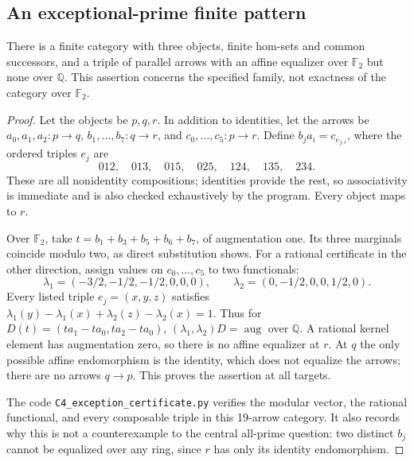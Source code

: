 \subsection{An exceptional-prime finite pattern}
\begin{proposition}
\label{C4:exception}
There is a finite category with three objects, finite hom-sets and common
successors, and a triple of parallel arrows with an affine equalizer over
$\mathbb F_2$ but none over $\mathbb Q$. This assertion concerns the
specified family, not exactness of the category over $\mathbb F_2$.
\end{proposition}
\begin{proof}
Let the objects be $p,q,r$. In addition to identities, let the arrows
be $a_0,a_1,a_2:p\to q$, $b_1,\ldots,b_7:q\to r$, and
$c_0,\ldots,c_5:p\to r$. Define $b_j a_i=c_{e_{j,i}}$, where the
ordered triples $e_j$ are
\[
 012,\quad013,\quad015,\quad025,\quad124,\quad135,\quad234.
\]
These are all nonidentity compositions; identities provide the rest,
so associativity is immediate and is also checked exhaustively by the
program. Every object maps to $r$.

Over $\mathbb F_2$, take
$t=b_1+b_3+b_5+b_6+b_7$, of augmentation one. Its three marginals
coincide modulo two, as direct substitution shows.
For a rational certificate in the other direction, assign values on
$c_0,\ldots,c_5$ to two functionals:
\[
 \lambda_1=(-3/2,-1/2,-1/2,0,0,0),\qquad
 \lambda_2=(0,-1/2,0,0,1/2,0).
\]
Every listed triple $e_j=(x,y,z)$ satisfies
$\lambda_1(y)-\lambda_1(x)+\lambda_2(z)-\lambda_2(x)=1$.
Thus for $D(t)=(ta_1-ta_0,ta_2-ta_0)$,
$(\lambda_1,\lambda_2)D=\operatorname{aug}$ over $\mathbb Q$.
A rational kernel element has augmentation zero, so there is no
affine equalizer at $r$. At $q$ the only possible affine endomorphism
is the identity, which does not equalize the arrows; there are no
arrows $q\to p$. This proves the assertion at all targets.

The code \texttt{C4\_exception\_certificate.py} verifies the modular
vector, the rational functional, and every composable triple in this
19-arrow category. It also records why this is not a counterexample
to the central all-prime question: two distinct $b_j$ cannot be
equalized over any ring, since $r$ has only its identity endomorphism.
\end{proof}

